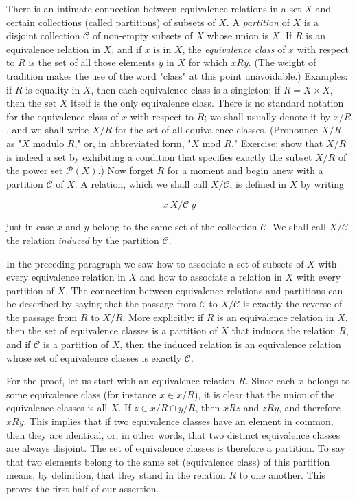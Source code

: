 There is an intimate connection between equivalence relations in a set $X$ and certain collections (called partitions) of subsets of $X$. A \textit{partition} of $X$ is a disjoint collection $ \mathcal{C} $ of non-empty subsets of $X$ whose union is $X$. If $R$ is an equivalence relation in $X$, and if $x$ is in $X$, the \textit{equivalence class} of $x$ with respect to $R$ is the set of all those elements $y$ in $X$ for which $x R y$. (The weight of tradition makes the use of the word "class" at this point unavoidable.) Examples: if $ R$ is equality in $X$, then each equivalence class is a singleton; if $R =  X \times X$, then the set $X$ itself is the only equivalence class. There is no standard notation for the equivalence class of $x$ with respect to $R$; we shall usually denote it by $x/ R$, and we shall write $X/ R$ for the set of all equivalence classes. (Pronounce $X/ R$ as "$X$ modulo $R$," or, in abbreviated form, "$X$ mod $R$." Exercise: show that $X/ R$ is indeed a set by exhibiting a condition that specifies exactly the subset $X/ R$ of the power set $\mathcal{P}(X)$.) Now forget $R$ for a moment and begin anew with a partition $\mathcal{C}$ of $X$. A relation, which we shall call $X/ \mathcal{C}$, is defined in $X$ by writing

\begin{equation*}
x \: X/ \mathcal{C} \: y
\end{equation*}

just in case $x$ and $y$ belong to the same set of the collection $\mathcal{C}$. We shall call $X/ \mathcal{C}$ the relation \textit{induced} by the partition $\mathcal{C}$.

In the preceding paragraph we saw how to associate a set of subsets of $X$ with every equivalence relation in $X$ and how to associate a relation in $X$ with every partition of $X$. The connection between equivalence relations and partitions can be described by saying that the passage from $\mathcal{C}$ to $X/ \mathcal{C}$ is exactly the reverse of the passage from $R$ to $X/ R$. More explicitly: if $R$ is an equivalence relation in $X$, then the set of equivalence classes is a partition of $X$ that induces the relation $R$, and if $\mathcal{C}$ is a partition of $X$, then the induced relation is an equivalence relation whose set of equivalence classes is exactly $\mathcal{C}$. 

For the proof, let us start with an equivalence relation $R$. Since each $x$ belongs to some equivalence class (for instance $x \in x/ R$), it is clear that the union of the equivalence classes is all $X$. If $z \in x/ R \cap y/ R$, then $x R z$ and $z R y$, and therefore $x R y$. This implies that if two equivalence classes have an element in common, then they are identical, or, in other words, that two distinct  equivalence classes are always disjoint. The set of equivalence classes is therefore a partition. To say that two elements belong to the same set (equivalence class) of this partition means, by definition, that they stand in the relation $R$ to one another. This proves the first half of our assertion. 


